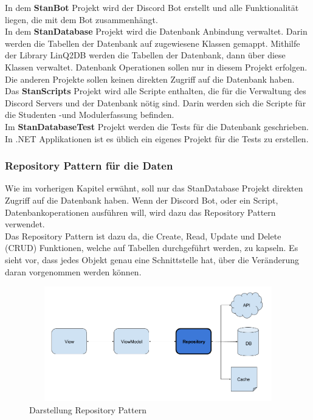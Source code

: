 \documentclass[a4paper, table]{article}
\begin{document}
In dem \textbf{StanBot} Projekt wird der Discord Bot erstellt und alle Funktionalität liegen,
die mit dem Bot zusammenhängt.\\
In dem \textbf{StanDatabase} Projekt wird die Datenbank Anbindung verwaltet.
Darin werden die Tabellen der Datenbank auf zugewiesene Klassen gemappt.
Mithilfe der Library LinQ2DB werden die Tabellen der Datenbank, dann über diese Klassen verwaltet.
Datenbank Operationen sollen nur in diesem Projekt erfolgen. 
Die anderen Projekte sollen keinen direkten Zugriff auf die Datenbank haben.\\
Das \textbf{StanScripts} Projekt wird alle Scripte enthalten, 
die für die Verwaltung des Discord Servers und der Datenbank nötig sind.
Darin werden sich die Scripte für die Studenten -und Modulerfassung befinden.\\
Im \textbf{StanDatabaseTest} Projekt werden die Tests für die Datenbank geschrieben.
In .NET Applikationen ist es üblich ein eigenes Projekt für die Tests zu erstellen.\autocite{tdykstra_organisieren_nodate}

\subsubsection{Repository Pattern für die Daten}
Wie im vorherigen Kapitel erwähnt, soll nur das StanDatabase Projekt direkten Zugriff auf die Datenbank haben.
Wenn der Discord Bot, oder ein Script, Datenbankoperationen ausführen will, wird dazu das Repository Pattern verwendet.\\
Das Repository Pattern ist dazu da, die Create, Read, Update und Delete (CRUD) Funktionen, 
welche auf Tabellen durchgeführt werden, zu kapseln. \autocite{gosebrink_aspnet_2014}
Es sieht vor, dass jedes Objekt genau eine Schnittstelle hat, über die Veränderung daran vorgenommen werden können.

\begin{figure}[h]
    \centering
    \includegraphics[width=1\textwidth,height=5cm]{img/Repository_Pattern.png}
    \caption{Darstellung Repository Pattern}
    \label{fig:repository_pattern}
\end{figure}
\end{document}

